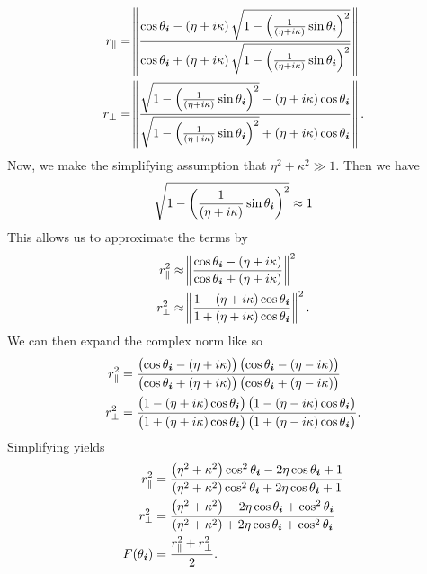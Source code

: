 \documentclass[12pt]{article}
\begin{document}
\begin{align*}
  r_{\parallel} &= \norm{\frac{\cos \theta_{\bm i} - \del{\eta + i\kappa} \sqrt{1 - \del{\frac{1}{\del{\eta + i\kappa}}\sin \theta_{\bm i}}^2}}{\cos \theta_{\bm i} + \del{\eta + i\kappa} \sqrt{1 - \del{\frac{1}{\del{\eta + i\kappa}}\sin \theta_{\bm i}}^2}}}\\
  r_{\perp} &= \norm{\frac{\sqrt{1 - \del{\frac{1}{\del{\eta + i\kappa}}\sin \theta_{\bm i}}^2} - \del{\eta + i\kappa}\cos \theta_{\bm i}}{\sqrt{1 - \del{\frac{1}{\del{\eta + i\kappa}}\sin \theta_{\bm i}}^2} + \del{\eta + i\kappa} \cos \theta_{\bm i}}}.
\end{align*}
Now, we make the simplifying assumption that \(\eta^2 + \kappa^2 \gg 1\). Then we have
\[\sqrt{1 - \del{\frac{1}{\del{\eta + i\kappa}}\sin \theta_{\bm i}}^2} \approx 1\]
This allows us to approximate the terms by
\begin{align*}
  r_{\parallel}^2 &\approx \norm{\frac{\cos \theta_{\bm i} - \del{\eta + i\kappa}}{\cos \theta_{\bm i} + \del{\eta + i\kappa}}}^2\\
  r_{\perp}^2 &\approx \norm{\frac{1 - \del{\eta + i\kappa}\cos \theta_{\bm i}}{1 + \del{\eta + i\kappa} \cos \theta_{\bm i}}}^2.
\end{align*}
We can then expand the complex norm like so
\begin{align*}
  r_{\parallel}^2 &= \frac{\del{\cos \theta_{\bm i} - \del{\eta + i\kappa}}\del{\cos \theta_{\bm i} - \del{\eta - i\kappa}}}{\del{\cos \theta_{\bm i} + \del{\eta + i\kappa}}\del{\cos \theta_{\bm i} + \del{\eta - i\kappa}}}\\
  r_{\perp}^2 &= \frac{\del{1 - \del{\eta + i\kappa}\cos \theta_{\bm i}}\del{1 - \del{\eta - i\kappa}\cos \theta_{\bm i}}}{\del{1 + \del{\eta + i\kappa} \cos \theta_{\bm i}}\del{1 + \del{\eta - i\kappa} \cos \theta_{\bm i}}}.
\end{align*}
Simplifying yields
\begin{align*}
  r_{\parallel}^2 &= \frac{\del{\eta^2 + \kappa^2}\cos^2 \theta_{\bm i} - 2\eta \cos \theta_{\bm i} + 1}{\del{\eta^2 + \kappa^2}\cos^2 \theta_{\bm i} + 2\eta \cos \theta_{\bm i} + 1}\\
  r_{\perp}^2 &= \frac{\del{\eta^2 + \kappa^2} - 2\eta \cos \theta_{\bm i} + \cos^2 \theta_{\bm i}}{\del{\eta^2 + \kappa^2} + 2\eta \cos \theta_{\bm i} + \cos^2 \theta_{\bm i}}\\
  F(\theta_{\bm i}) &= \frac{r_{\parallel}^2 + r_{\perp}^2}{2}.
\end{align*}
\end{document}

